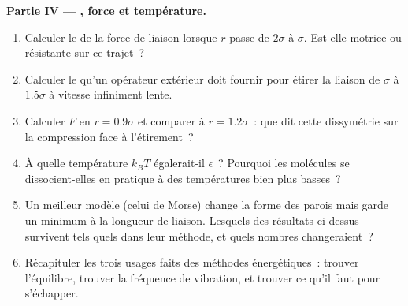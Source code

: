 \begin{problem}
\medskip
\noindent\textbf{Partie IV --- , force et température.}
\begin{enumerate}[resume]
  \item Calculer le  de la force de liaison lorsque $r$ passe de
        $2\sigma$ à $\sigma$. Est-elle motrice ou résistante sur ce trajet~?
  \item Calculer le  qu'un opérateur extérieur doit fournir pour
        étirer la liaison de $\sigma$ à $1.5\sigma$ à vitesse
        infiniment lente.
  \item Calculer $F$ en $r = 0.9\sigma$ et comparer à $r = 1.2\sigma$~:
        que dit cette dissymétrie sur la compression face à l'étirement~?
  \item À quelle température $k_BT$ égalerait-il $\epsilon$~? Pourquoi
        les molécules se dissocient-elles en pratique à des températures
        bien plus basses~?
  \item Un meilleur modèle (celui de Morse) change la forme des parois
        mais garde un minimum à la longueur de liaison. Lesquels des
        résultats ci-dessus survivent tels quels dans leur méthode, et
        quels nombres changeraient~?
  \item Récapituler les trois usages faits des méthodes énergétiques~:
        trouver l'équilibre, trouver la fréquence de vibration, et
        trouver ce qu'il faut pour s'échapper.
\end{enumerate}
\end{problem}
